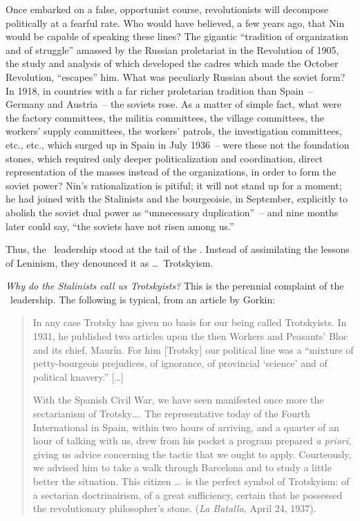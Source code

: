 Once embarked on a false, opportunist course, revolutionists will decompose politically at a fearful rate. Who would have believed, a few years ago, that Nin would be capable of speaking these lines? The gigantic ``tradition of organization and of struggle'' amassed by the Russian proletariat in the Revolution of 1905, the study and analysis of which developed the cadres which made the October Revolution, ``escapes'' him. What was peculiarly Russian about the soviet form? In 1918, in countries with a far richer proletarian tradition than Spain~-- Germany and Austria~-- the soviets rose. As a matter of simple fact, what were the factory committees, the militia committees, the village committees, the workers’ supply committees, the workers’ patrols, the investigation committees, etc., etc., which surged up in Spain in July 1936~-- were these not the foundation stones, which required only deeper politicalization and coordination, direct representation of the masses instead of the organizations, in order to form the soviet power? Nin’s rationalization is pitiful; it will not stand up for a moment; he had joined with the Stalinists and the bourgeoisie, in September, explicitly to abolish the soviet dual power as ``unnecessary duplication''~-- and nine months later could say, ``the soviets have not risen among us.''

Thus, the \POUM\ leadership stood at the tail of the \CNT\kn. Instead of assimilating the lessons of Leninism, they denounced it as \dots\ Trotskyism.

\emph{Why do the Stalinists call us Trotskyists?} This is the perennial complaint of the \POUM\ leadership. The following is typical, from an article by Gorkin:

\begin{quotation}
  In any case Trotsky has given no basis for our being called Trotskyists. In 1931, he published two articles upon the then Workers and Peasants' Bloc and its chief, Maur\'in. For him [Trotsky] our political line was a ``mixture of petty-bourgeois prejudices, of ignorance, of provincial `science' and of political knavery.'' [\dots]
  
  With the Spanish Civil War, we have seen manifested once more the sectarianism of Trotsky\dots. The representative today of the Fourth International in Spain, within two hours of arriving, and a quarter of an hour of talking with us, drew from his pocket a program prepared \emph{a priori,} giving us advice concerning the tactic that we ought to apply. Courteously, we advised him to take a walk through Barcelona and to study a little better the situation. This citizen \dots\ is the perfect symbol of Trotskyism: of a sectarian doctrinairism, of a great sufficiency, certain that he possessed the revolutionary philosopher’s stone. (\emph{La Batalla,} April 24, 1937).
\end{quotation}

